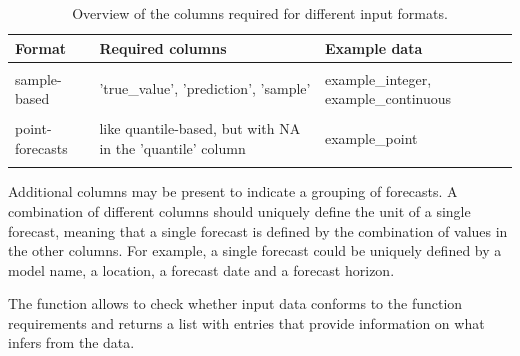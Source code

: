 \documentclass[
]{jss}
\begin{document}
\begin{CodeChunk}
\begin{table}

\caption{\label{tab:column-requirements}Overview of the columns required for different input formats.}
\centering
\begin{tabular}[t]{l>{\raggedright\arraybackslash}p{6cm}>{\raggedright\arraybackslash}p{3.7cm}}
\toprule
Format & Required columns & Example data\\
\midrule
\cellcolor{gray!6}{quantile-based} & \cellcolor{gray!6}{'true\_value', 'prediction', 'quantile'} & \cellcolor{gray!6}{example\_quantile}\\
\addlinespace
sample-based & 'true\_value', 'prediction', 'sample' & example\_integer, 
  example\_continuous\\
\addlinespace
\cellcolor{gray!6}{binary} & \cellcolor{gray!6}{'true\_value', 'prediction'} & \cellcolor{gray!6}{example\_binary}\\
\addlinespace
point-forecasts & like quantile-based, but with 
 NA in the 'quantile' column & example\_point\\
\addlinespace
\cellcolor{gray!6}{pairwise-comparisons} & \cellcolor{gray!6}{additionally a column 'model'} & \cellcolor{gray!6}{\textasciitilde{}}\\
\bottomrule
\end{tabular}
\end{table}

\end{CodeChunk}

Additional columns may be present to indicate a grouping of forecasts. A
combination of different columns should uniquely define the unit of a
single forecast, meaning that a single forecast is defined by the
combination of values in the other columns. For example, a single
forecast could be uniquely defined by a model name, a location, a
forecast date and a forecast horizon.

The function  allows to check whether input
data conforms to the function requirements and returns a list with
entries that provide information on what  infers from
the data.
\end{document}
